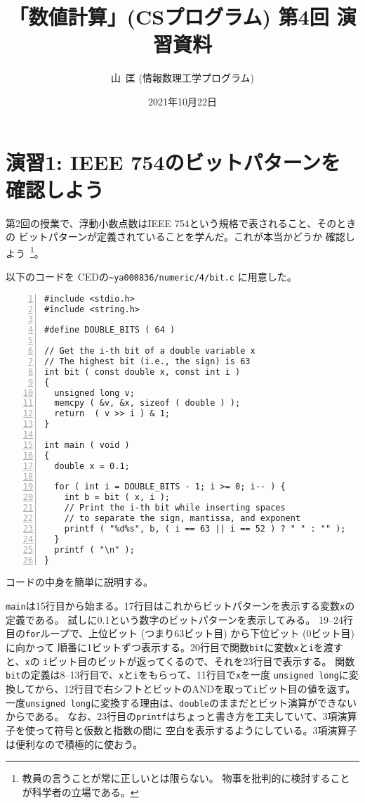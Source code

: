 \documentclass[a4paper]{jsarticle}
\title{「数値計算」(CSプログラム) 第4回 演習資料}
\author{山\zaki\ 匡 (情報数理工学プログラム)}
\date{2021年10月22日}
\begin{document}
\maketitle

\section*{演習1: IEEE 754のビットパターンを確認しよう}

第2回の授業で、浮動小数点数はIEEE 754という規格で表されること、そのときの
ビットパターンが定義されていることを学んだ。これが本当かどうか
確認しよう~\footnote{教員の言うことが常に正しいとは限らない。
物事を批判的に検討することが科学者の立場である。}。

以下のコードを CEDの\texttt{\~{}ya000836/numeric/4/bit.c} に用意した。
\begin{lstlisting}[caption={\texttt{bit.c}},numbers=left]
#include <stdio.h>
#include <string.h>

#define DOUBLE_BITS ( 64 )

// Get the i-th bit of a double variable x
// The highest bit (i.e., the sign) is 63
int bit ( const double x, const int i )
{
  unsigned long v;
  memcpy ( &v, &x, sizeof ( double ) );
  return  ( v >> i ) & 1;
}

int main ( void )
{
  double x = 0.1;

  for ( int i = DOUBLE_BITS - 1; i >= 0; i-- ) {
    int b = bit ( x, i );
    // Print the i-th bit while inserting spaces
    // to separate the sign, mantissa, and exponent
    printf ( "%d%s", b, ( i == 63 || i == 52 ) ? " " : "" );
  }
  printf ( "\n" );
}
\end{lstlisting}
コードの中身を簡単に説明する。

\texttt{main}は15行目から始まる。17行目はこれからビットパターンを表示する変数\texttt{x}の定義である。
試しに0.1という数字のビットパターンを表示してみる。
%
19--24行目の\texttt{for}ループで、上位ビット (つまり63ビット目) から下位ビット (0ビット目) に向かって
順番に1ビットずつ表示する。20行目で関数\texttt{bit}に変数\texttt{x}と\texttt{i}を渡すと、\texttt{x}の
\texttt{i}ビット目のビットが返ってくるので、それを23行目で表示する。
%
関数\texttt{bit}の定義は8--13行目で、\texttt{x}と\texttt{i}をもらって、11行目で\texttt{x}を一度
\texttt{unsigned long}に変換してから、12行目で右シフトとビットのANDを取って\texttt{i}ビット目の値を返す。
一度\texttt{unsigned long}に変換する理由は、\texttt{double}のままだとビット演算ができないからである。
%
なお、23行目の\texttt{printf}はちょっと書き方を工夫していて、3項演算子を使って符号と仮数と指数の間に
空白を表示するようにしている。3項演算子は便利なので積極的に使おう。
\end{document}
